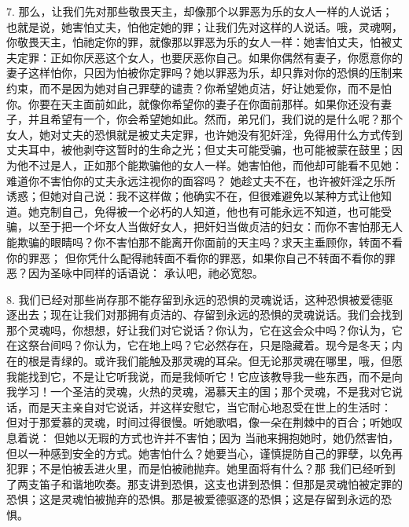7. 那么，让我们先对那些敬畏天主，却像那个以罪恶为乐的女人一样的人说话；也就是说，她害怕丈夫，怕他定她的罪；让我们先对这样的人说话。哦，灵魂啊，你敬畏天主，怕祂定你的罪，就像那以罪恶为乐的女人一样：她害怕丈夫，怕被丈夫定罪：正如你厌恶这个女人，也要厌恶你自己。如果你偶然有妻子，你愿意你的妻子这样怕你，只因为怕被你定罪吗？她以罪恶为乐，却只靠对你的恐惧的压制来约束，而不是因为她对自己罪孽的谴责？你希望她贞洁，好让她爱你，而不是怕你。你要在天主面前如此，就像你希望你的妻子在你面前那样。如果你还没有妻子，并且希望有一个，你会希望她如此。然而，弟兄们，我们说的是什么呢？那个女人，她对丈夫的恐惧就是被丈夫定罪，也许她没有犯奸淫，免得用什么方式传到丈夫耳中，被他剥夺这暂时的生命之光；但丈夫可能受骗，也可能被蒙在鼓里；因为他不过是人，正如那个能欺骗他的女人一样。她害怕他，而他却可能看不见她：难道你不害怕你的丈夫永远注视你的面容吗？ 她趁丈夫不在，也许被奸淫之乐所诱惑；但她对自己说：我不这样做；他确实不在，但很难避免以某种方式让他知道。她克制自己，免得被一个必朽的人知道，他也有可能永远不知道，也可能受骗，以至于把一个坏女人当做好女人，把奸妇当做贞洁的妇女：而你不害怕那无人能欺骗的眼睛吗？你不害怕那不能离开你面前的天主吗？求天主垂顾你，转面不看你的罪恶； 但你凭什么配得祂转面不看你的罪恶，如果你自己不转面不看你的罪恶？因为圣咏中同样的话语说： 承认吧，祂必宽恕。\par

8. 我们已经对那些尚存那不能存留到永远的恐惧的灵魂说话，这种恐惧被爱德驱逐出去；现在让我们对那拥有贞洁的、存留到永远的恐惧的灵魂说话。我们会找到那个灵魂吗，你想想，好让我们对它说话？你认为，它在这会众中吗？你认为，它在这祭台间吗？你认为，它在地上吗？它必然存在，只是隐藏着。现今是冬天；内在的根是青绿的。或许我们能触及那灵魂的耳朵。但无论那灵魂在哪里，哦，但愿我能找到它，不是让它听我说，而是我倾听它！它应该教导我一些东西，而不是向我学习！一个圣洁的灵魂，火热的灵魂，渴慕天主的国；那个灵魂，不是我对它说话，而是天主亲自对它说话，并这样安慰它，当它耐心地忍受在世上的生活时： 但对于那爱慕的灵魂，时间过得很慢。听她歌唱，像一朵在荆棘中的百合；听她叹息着说： 但她以无瑕的方式也许并不害怕；因为 当祂来拥抱她时，她仍然害怕，但以一种感到安全的方式。她害怕什么？她要当心，谨慎提防自己的罪孽，以免再犯罪；不是怕被丢进火里，而是怕被祂抛弃。她里面将有什么？那 我们已经听到了两支笛子和谐地吹奏。那支讲到恐惧，这支也讲到恐惧：但那是灵魂怕被定罪的恐惧；这是灵魂怕被抛弃的恐惧。那是被爱德驱逐的恐惧；这是存留到永远的恐惧。\par

